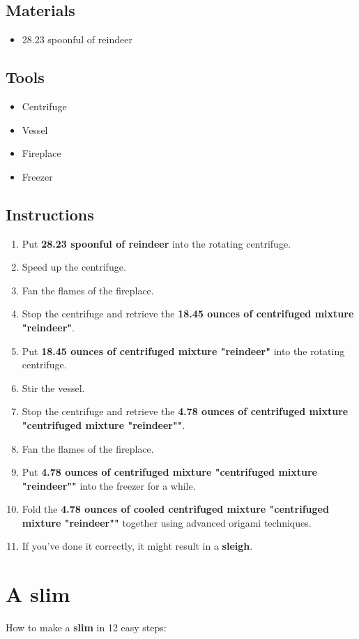 \documentclass{article}
\begin{document}
\subsection{Materials}\begin{itemize}
\item 
28.23 spoonful of reindeer
\end{itemize}
\subsection{Tools}\begin{itemize}
\item 
Centrifuge
\item 
Vessel
\item 
Fireplace
\item 
Freezer
\end{itemize}
\subsection{Instructions}\begin{enumerate}
\item 
Put \textbf{28.23 spoonful of reindeer} into the rotating centrifuge.
\item 
Speed up the centrifuge.
\item 
Fan the flames of the fireplace.
\item 
Stop the centrifuge and retrieve the \textbf{18.45 ounces of centrifuged mixture "reindeer"}.
\item 
Put \textbf{18.45 ounces of centrifuged mixture "reindeer"} into the rotating centrifuge.
\item 
Stir the vessel.
\item 
Stop the centrifuge and retrieve the \textbf{4.78 ounces of centrifuged mixture "centrifuged mixture "reindeer""}.
\item 
Fan the flames of the fireplace.
\item 
Put \textbf{4.78 ounces of centrifuged mixture "centrifuged mixture "reindeer""} into the freezer for a while.
\item 
Fold the \textbf{4.78 ounces of cooled centrifuged mixture "centrifuged mixture "reindeer""} together using advanced origami techniques.
\item 
If you've done it correctly, it might result in a \textbf{sleigh}.
\end{enumerate}
\newpage
\section{A slim}How to make a \textbf{slim} in 12 easy steps:
\end{document}
